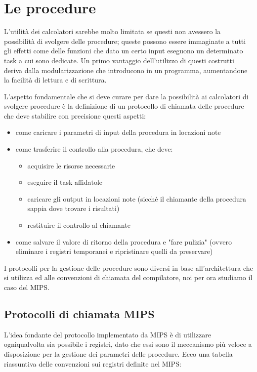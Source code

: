 \documentclass[class=book, crop=false, oneside]{standalone}
\begin{document}

\section{Le procedure}
L'utilità dei calcolatori sarebbe molto limitata se questi non avessero la possibilità di svolgere delle procedure; queste possono essere immaginate a tutti gli effetti come delle funzioni che dato un certo input eseguono un determinato task a cui sono dedicate. Un primo vantaggio dell'utilizzo di questi costrutti deriva dalla modularizzazione che introducono in un programma, aumentandone la facilità di lettura e di scrittura.

L'aspetto fondamentale che si deve curare per dare la possibilità ai calcolatori di svolgere procedure è la definizione di un protocollo di chiamata delle procedure che deve stabilire con precisione questi aspetti:
\begin{itemize}[noitemsep]
	\item come caricare i parametri di input della procedura in locazioni note
	\item come trasferire il controllo alla procedura, che deve:
		\begin{itemize}[nolistsep, noitemsep]
			\item acquisire le risorse necessarie
			\item eseguire il task affidatole
			\item caricare gli output in locazioni note (sicché il chiamante della procedura sappia dove trovare i risultati)
			\item restituire il controllo al chiamante
		\end{itemize}
	\item come salvare il valore di ritorno della procedura e "fare pulizia"  (ovvero eliminare i registri temporanei  e ripristinare quelli da preservare)
\end{itemize}
I protocolli per la gestione delle procedure sono diversi in base all'architettura che si utilizza ed alle convenzioni di chiamata del compilatore, noi per ora studiamo il caso del MIPS.

\subsection{Protocolli di chiamata MIPS}
L'idea fondante del protocollo implementato da MIPS è di utilizzare ogniqualvolta sia possibile i registri, dato che essi sono il meccanismo più veloce a disposizione per la gestione dei parametri delle procedure. Ecco una tabella riassuntiva delle convenzioni sui registri definite nel MIPS:
\end{document}
